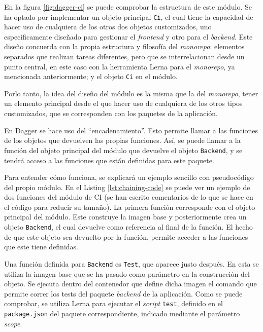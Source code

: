 En la figura \ref{fig:dagger-ci} se puede comprobar la estructura de este módulo. Se ha optado por implementar un objeto principal \texttt{Ci}, el cual tiene la capacidad de hacer uso de cualquiera de los otros dos objetos customizados, uno específicamente diseñado para gestionar el \textit{frontend} y otro para el \textit{backend}. Este diseño concuerda con la propia estructura y filosofía del \textit{monorepo}: elementos separados que realizan tareas diferentes, pero que se interrelacionan desde un punto central, en este caso con la herramienta Lerna para el \textit{monorepo}, ya mencionada anteriormente; y el objeto \texttt{Ci} en el módulo.

Porlo tanto, la idea del diseño del módulo es la misma que la del \textit{monorepo}, tener un elemento principal desde el que hacer uso de cualquiera de los otros tipos customizados\cite{dagger-custom-types}, que se corresponden con los paquetes de la aplicación.

En Dagger se hace uso del ``encadenamiento''. Esto permite llamar a las funciones de los objetos que devuelven las propias funciones. Así, se puede llamar a la función del objeto principal del módulo que devuelve el objeto \texttt{Backend}, y se tendrá acceso a las funciones que están definidas para este paquete.

Para entender cómo funciona, se explicará un ejemplo sencillo con pseudocódigo del propio módulo. En el Listing \ref{lst:chaining-code} se puede ver un ejemplo de dos funciones del módulo de CI (se han escrito comentarios de lo que se hace en el código para reducir su tamaño). La primera función corresponde con el objeto principal del módulo. Este construye la imagen base y posteriormente crea un objeto \texttt{Backend}, el cual devuelve como referencia al final de la función. El hecho de que este objeto sea devuelto por la función, permite acceder a las funciones que este tiene definidas.

Una función definida para \texttt{Backend} es \texttt{Test}, que aparece justo después. En esta se utiliza la imagen base que se ha pasado como parámetro en la construcción del objeto. Se ejecuta dentro del contenedor que define dicha imagen el comando que permite correr los tests del paquete \textit{backend} de la aplicación. Como se puede comprobar, se utiliza Lerna para ejecutar el \textit{script} \texttt{test}, definido en el \texttt{package.json} del paquete correspondiente, indicado mediante el parámetro \textit{scope}.

